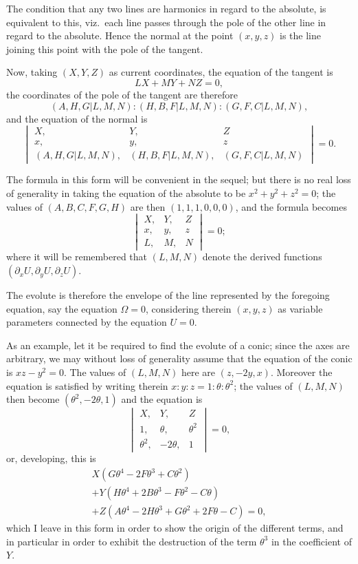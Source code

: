 \documentclass[11pt,a4paper]{article}
\theoremstyle{plain}
\begin{document}
The condition that any two lines are harmonics in regard to the absolute, is equivalent to this, viz.\ each line passes through the pole of the other line in regard to the absolute. Hence the normal at the point $(x, y, z)$ is the line joining this point with the pole of the tangent.

Now, taking $(X, Y, Z)$ as current coordinates, the equation of the tangent is
\[
LX + MY + NZ = 0,
\]
the coordinates of the pole of the tangent are therefore
\[
(A, H, G  |  L, M, N) : (H, B, F  |  L, M, N) : (G, F, C  |  L, M, N),
\]
and the equation of the normal is
\[
\begin{vmatrix}
X, & Y, & Z \\
x, & y, & z \\
(A, H, G  |  L, M, N), & (H, B, F  |  L, M, N), & (G, F, C  |  L, M, N)
\end{vmatrix}
= 0.
\]

The formula in this form will be convenient in the sequel; but there is no real loss of generality in taking the equation of the absolute to be $x^2 + y^2 + z^2 = 0$; the values of $(A, B, C, F, G, H)$ are then $(1, 1, 1, 0, 0, 0)$, and the formula becomes
\[
\begin{vmatrix}
X, & Y, & Z \\
x, & y, & z \\
L, & M, & N
\end{vmatrix}
= 0;
\]
where it will be remembered that $(L, M, N)$ denote the derived functions $(\partial_x U, \partial_y U, \partial_z U)$.

The evolute is therefore the envelope of the line represented by the foregoing equation, say the equation $\Omega = 0$, considering therein $(x, y, z)$ as variable parameters connected by the equation $U = 0$.

As an example, let it be required to find the evolute of a conic; since the axes are arbitrary, we may without loss of generality assume that the equation of the conic is $xz - y^2 = 0$. The values of $(L, M, N)$ here are $(z, -2y, x)$. Moreover the equation is satisfied by writing therein $x : y : z = 1 : \theta : \theta^2$; the values of $(L, M, N)$ then become $(\theta^2, -2\theta, 1)$ and the equation is
\[
\begin{vmatrix}
X, & Y, & Z \\
1, & \theta, & \theta^2 \\
\theta^2, & -2\theta, & 1
\end{vmatrix}
= 0,
\]
or, developing, this is
\begin{multline*}
X(G\theta^4 - 2F\theta^3 + C\theta^2) \\
+ Y(H\theta^4 + 2B\theta^3 - F\theta^2 - C\theta) \\
+ Z(A\theta^4 - 2H\theta^3 + G\theta^2 + 2F\theta - C) = 0,
\end{multline*}
which I leave in this form in order to show the origin of the different terms, and in particular in order to exhibit the destruction of the term $\theta^3$ in the coefficient of $Y$.
\end{document}
